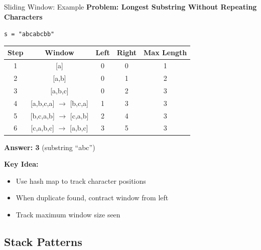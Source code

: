 \documentclass[aspectratio=169,xcolor=dvipsnames]{beamer}
\begin{document}
\begin{frame}{Sliding Window: Example}
  \textbf{Problem: Longest Substring Without Repeating Characters}

  \vspace{0.3cm}
  \begin{center}
    \texttt{s = "abcabcbb"}
  \end{center}

  \vspace{0.3cm}
  \begin{table}
    \centering
    \tiny
    \begin{tabular}{ccccc}
      \hline
      \textbf{Step} & \textbf{Window} & \textbf{Left} & \textbf{Right} & \textbf{Max Length} \\
      \hline
      1 & [a] & 0 & 0 & 1 \\
      2 & [a,b] & 0 & 1 & 2 \\
      3 & [a,b,c] & 0 & 2 & 3 \\
      4 & [a,b,c,a] $\to$ [b,c,a] & 1 & 3 & 3 \\
      5 & [b,c,a,b] $\to$ [c,a,b] & 2 & 4 & 3 \\
      6 & [c,a,b,c] $\to$ [a,b,c] & 3 & 5 & 3 \\
      \hline
    \end{tabular}
  \end{table}

  \vspace{0.3cm}
  \textbf{Answer: 3} (substring ``abc'')

  \vspace{0.2cm}
  \textbf{Key Idea:}
  \begin{itemize}
    \item Use hash map to track character positions
    \item When duplicate found, contract window from left
    \item Track maximum window size seen
  \end{itemize}
\end{frame}

\subsection{Stack Patterns}
\end{document}
